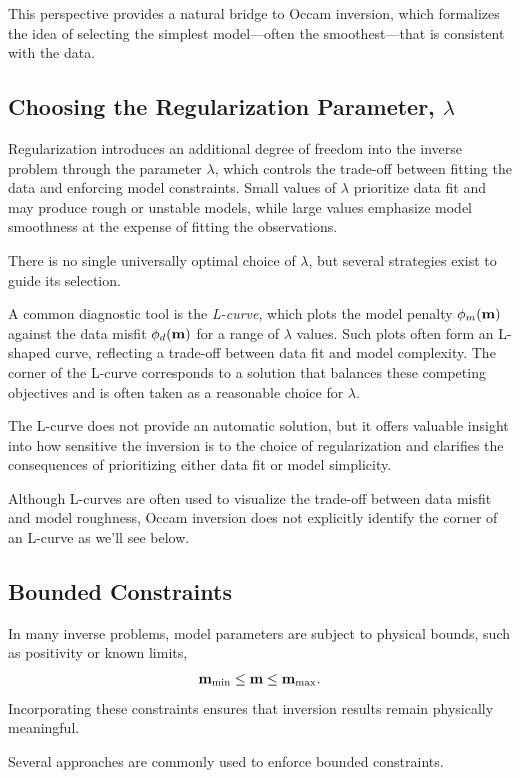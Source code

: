 This perspective provides a natural bridge to Occam inversion, which formalizes the idea of selecting the simplest model—often the smoothest—that is consistent with the data.

\subsection{Choosing the Regularization Parameter, $\lambda$}

Regularization introduces an additional degree of freedom into the inverse problem through the parameter $\lambda$, which controls the trade-off between fitting the data and enforcing model constraints. Small values of $\lambda$ prioritize data fit and may produce rough or unstable models, while large values emphasize model smoothness at the expense of fitting the observations.

There is no single universally optimal choice of $\lambda$, but several strategies exist to guide its selection.

A common diagnostic tool is the \emph{L-curve}, which plots the model penalty $\phi_m(\vb{m})$ against the data misfit $\phi_d(\vb{m})$ for a range of $\lambda$ values. Such plots often form an L-shaped curve, reflecting a trade-off between data fit and model complexity. The corner of the L-curve corresponds to a solution that balances these competing objectives and is often taken as a reasonable choice for $\lambda$.

The L-curve does not provide an automatic solution, but it offers valuable insight into how sensitive the inversion is to the choice of regularization and clarifies the consequences of prioritizing either data fit or model simplicity.

Although L-curves are often used to visualize the trade-off between data misfit and model roughness, Occam inversion does not explicitly identify the corner of an L-curve as we'll see below.

\subsection{Bounded Constraints}

In many inverse problems, model parameters are subject to physical bounds, such as positivity or known limits,
\[
    \vb{m}_{\min} \le \vb{m} \le \vb{m}_{\max}.
\]
Incorporating these constraints ensures that inversion results remain physically meaningful.

Several approaches are commonly used to enforce bounded constraints.


